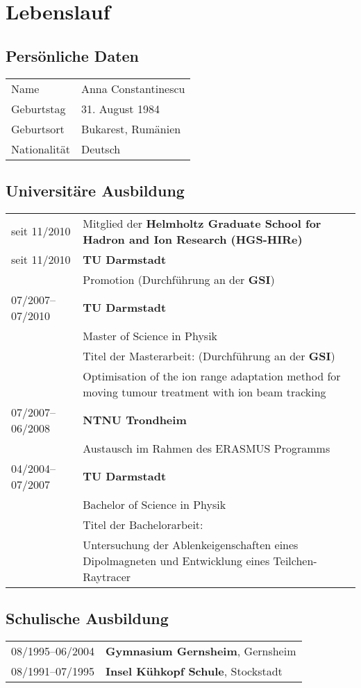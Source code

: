 
\chapter*{Lebenslauf}

\section*{Pers\"onliche Daten}
\begin{tabular}{p{}p{}}
  \hfill Name & Anna Constantinescu\\
  \hfill Geburtstag & 31. August 1984\\
  \hfill Geburtsort & Bukarest, Rum\"anien\\
  \hfill Nationalit\"at & Deutsch\\
\end{tabular}

\section*{Universit\"are Ausbildung}
\begin{tabular}{p{}p{}}
  \hfill seit 11/2010 & Mitglied der \textbf{Helmholtz Graduate School for Hadron and Ion Research (HGS-HIRe)} \\
  \hfill seit 11/2010 & \textbf{TU Darmstadt} \\
  & Promotion (Durchf\"uhrung an der \textbf{GSI})\\
  \hfill 07/2007--07/2010 & \textbf{TU Darmstadt}\\
  & Master of Science in Physik\\
  & Titel der Masterarbeit: (Durchf\"uhrung an der \textbf{GSI})\\
  & Optimisation of the ion range adaptation method for moving tumour treatment with ion beam tracking \\
  \hfill 07/2007--06/2008 & \textbf{NTNU Trondheim}\\
  & Austausch im Rahmen des ERASMUS Programms\\
  \hfill 04/2004--07/2007 & \textbf{TU Darmstadt}\\
  & Bachelor of Science in Physik\\
  & Titel der Bachelorarbeit:\\
  & Untersuchung der Ablenkeigenschaften eines Dipolmagneten und Entwicklung eines Teilchen-Raytracer \\
\end{tabular}

\section*{Schulische Ausbildung}
\begin{tabular}{p{}p{}}
  \hfill 08/1995--06/2004 & \textbf{Gymnasium Gernsheim}, Gernsheim\\
  \hfill 08/1991--07/1995 & \textbf{Insel K\"uhkopf Schule}, Stockstadt\\
\end{tabular}
